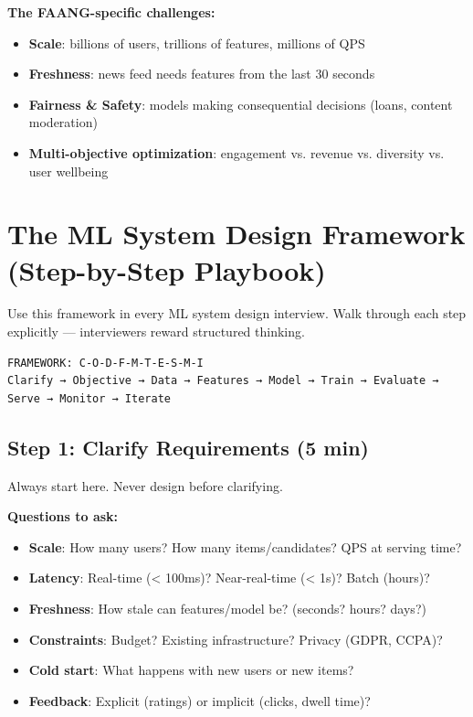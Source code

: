 \documentclass[11pt]{article}
\providecommand{\tightlist}{\setlength{\itemsep}{1pt}\setlength{\parskip}{0pt}}
\begin{document}
\textbf{The FAANG-specific challenges:}

\begin{itemize}
\tightlist
\item
  \textbf{Scale}: billions of users, trillions of features, millions of QPS
\item
  \textbf{Freshness}: news feed needs features from the last 30 seconds
\item
  \textbf{Fairness \& Safety}: models making consequential decisions (loans, content moderation)
\item
  \textbf{Multi-objective optimization}: engagement vs. revenue vs. diversity vs. user wellbeing
\end{itemize}

\section{The ML System Design Framework (Step-by-Step Playbook)}\label{the-ml-system-design-framework-step-by-step-playbook}

Use this framework in every ML system design interview. Walk through each step explicitly --- interviewers reward structured thinking.

\setcodelang{}

\begin{verbatim}
FRAMEWORK: C-O-D-F-M-T-E-S-M-I
Clarify → Objective → Data → Features → Model → Train → Evaluate → Serve → Monitor → Iterate
\end{verbatim}

\subsection{Step 1: Clarify Requirements (5 min)}\label{step-1-clarify-requirements-5-min}

Always start here. Never design before clarifying.

\textbf{Questions to ask:}

\begin{itemize}
\tightlist
\item
  \textbf{Scale}: How many users? How many items/candidates? QPS at serving time?
\item
  \textbf{Latency}: Real-time (\textless{} 100ms)? Near-real-time (\textless{} 1s)? Batch (hours)?
\item
  \textbf{Freshness}: How stale can features/model be? (seconds? hours? days?)
\item
  \textbf{Constraints}: Budget? Existing infrastructure? Privacy (GDPR, CCPA)?
\item
  \textbf{Cold start}: What happens with new users or new items?
\item
  \textbf{Feedback}: Explicit (ratings) or implicit (clicks, dwell time)?
\end{itemize}
\end{document}
